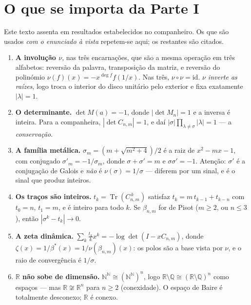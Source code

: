 \documentclass[11pt,a4paper]{article}
\theoremstyle{plain}
\theoremstyle{definition}
\theoremstyle{remark}
\newcommand{\R}{\mathbb{R}}
\newcommand{\Q}{\mathbb{Q}}
\newcommand{\N}{\mathbb{N}}
\providecommand{\Comp}[2]{C_{#1,#2}}
\begin{document}
\section{O que se importa da Parte I}\label{sec:importa}

Este texto assenta em resultados estabelecidos no companheiro. Os que são usados \emph{com o
enunciado à vista} repetem-se aqui; os restantes são citados.

\begin{enumerate}\itemsep3pt
\item[\textbf{(I1)}] \textbf{A involução $\nu$}, nas três encarnações, que são a mesma operação em
três alfabetos: reversão da palavra, transposição da matriz, e reversão do polinómio
$\nu(f)(x) = -x^{\deg f}f(1/x)$. Nas três, $\nu\circ\nu = \mathrm{id}$. \emph{$\nu$ inverte as
raízes}, logo troca o interior do disco unitário pelo exterior e fixa exatamente $|\lambda|=1$.
\label{I1}

\item[\textbf{(I2)}] \textbf{O determinante.} $\det M(a) = -1$, donde $|\det M_n| = 1$ e a inversa
é inteira. Para a companheira, $|\det \Comp{n}{m}| = 1$, e daí
$|\sigma|\prod_{\lambda\neq\sigma}|\lambda| = 1$ --- a \emph{conservação}. \label{I2}

\item[\textbf{(I3)}] \textbf{A família metálica.} $\sigma_m = (m+\sqrt{m^2+4})/2$ é a raiz de
$x^2-mx-1$, com conjugado $\sigma'_m = -1/\sigma_m$, donde $\sigma+\sigma' = m$ e
$\sigma\sigma' = -1$. Atenção: $\sigma'$ é a conjugação de Galois e \emph{não} é $\nu(\sigma)=1/\sigma$
--- diferem por um sinal, e é o sinal que produz inteiros. \label{I3}

\item[\textbf{(I4)}] \textbf{Os traços são inteiros.} $t_k = \operatorname{Tr}(\Comp{n}{m}^{\,k})$
satisfaz $t_k = m\,t_{k-1}+t_{k-n}$ com $t_0=n$, $t_1=m$, e é inteiro para todo $k$. Se $\beta_{n,m}$
for de Pisot ($m\geq2$, ou $n\leq3$), então $|\sigma^k-t_k|\to0$. \label{I4}

\item[\textbf{(I5)}] \textbf{A zeta dinâmica.} $\sum_k \frac{t_k}{k}x^k = -\log\det(I-x\Comp{n}{m})$,
donde $\zeta(x) = 1/\beta^*(x) = 1/\nu(\beta_{n,m})(x)$: os polos são a base vista por $\nu$, e o
raio de convergência é $1/\sigma$. \label{I5}

\item[\textbf{(I6)}] \textbf{$\R$ não sobe de dimensão.} $\N^{\N}\cong(\N^{\N})^n$, logo
$\R\setminus\Q \cong (\R\setminus\Q)^n$ como espaços --- mas $\R\not\cong\R^n$ para $n\geq2$
(conexidade). O espaço de Baire é totalmente desconexo; $\R$ é conexo. \label{I6}


\end{enumerate}
\end{document}

